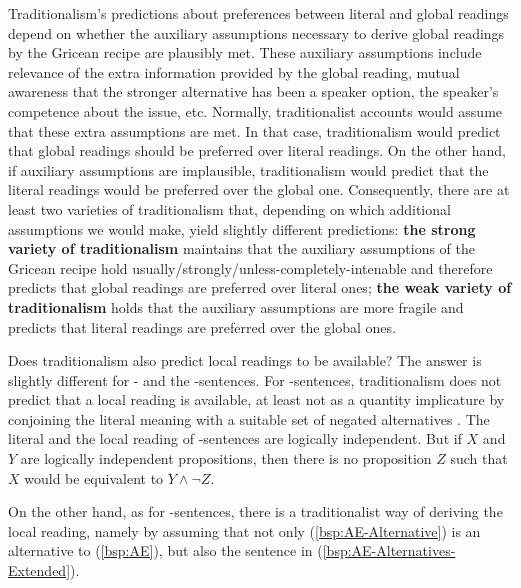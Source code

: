 \documentclass[fleqn,reqno,10pt,draft]{article}
\newcommand{\as}{\acro{as}}
\renewcommand{\es}{\acro{es}}
\renewcommand{\mymark}[1]{\textbf{#1}}
\begin{document}
Traditionalism's predictions about preferences between literal and
global readings depend on whether the auxiliary assumptions necessary
to derive global readings by the Gricean recipe are plausibly
met. These auxiliary assumptions include relevance of the extra
information provided by the global reading, mutual awareness that the
stronger alternative has been a speaker option, the speaker's
competence about the issue, etc. Normally, traditionalist accounts
would assume that these extra assumptions are met. In that case,
traditionalism would predict that global readings should be preferred
over literal readings. On the other hand, if auxiliary assumptions are
implausible, traditionalism would predict that the literal readings
would be preferred over the global one. Consequently, there are at
least two varieties of traditionalism that, depending on which
additional assumptions we would make, yield slightly different
predictions: \mymark{the strong variety of traditionalism} maintains
that the auxiliary assumptions of the Gricean recipe hold
usually/strongly/unless-completely-intenable and therefore predicts
that global readings are preferred over literal ones; \mymark{the weak
  variety of traditionalism} holds that the auxiliary assumptions are
more fragile and predicts that literal readings are preferred over the
global ones.

Does traditionalism also predict local readings to be available? The
answer is slightly different for \as- and the \es-sentences. For
\es-sentences, traditionalism does not predict that a local reading is
available, at least not as a quantity implicature by conjoining the
literal meaning with a suitable set of negated alternatives
\citep[see][]{GeurtsPouscoulous2009:Embedded-Implic,ChemlaSpector2010:Experimental-Ev}. The
literal and the local reading of \es-sentences are logically
independent. But if $X$ and $Y$ are logically independent
propositions, then there is no proposition $Z$ such that $X$ would be
equivalent to $Y \wedge \neg Z$.

On the other hand, as for \as-sentences, there is a traditionalist way
of deriving the local reading, namely by assuming that not only
(\ref{bsp:AE-Alternative}) is an alternative to (\ref{bsp:AE}), but
also the sentence in (\ref{bsp:AE-Alternatives-Extended}).
\end{document}

